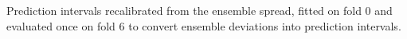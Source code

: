 Prediction intervals recalibrated from the ensemble spread, fitted on fold 0 and
evaluated once on fold 6 to convert ensemble deviations into prediction intervals.
